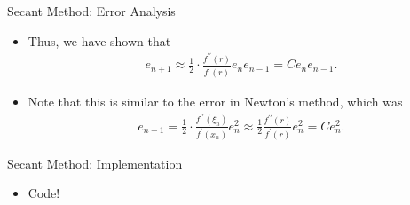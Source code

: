 \documentclass[9pt, serif]{beamer}
\newcommand{\bi}{\begin{itemize}}
\newcommand{\ei}{\end{itemize}}
\begin{document}
\begin{frame}{\hspace{50mm}Secant Method: Error Analysis}
	\bi 
		\item Thus, we have shown that %
			\begin{align*}
				e_{n+1}\approx\frac{1}{2}\cdot\frac{f^{\prime\prime}(r)}{f^\prime(r)}e_ne_{n-1}=Ce_ne_{n-1}.
			\end{align*}
		\pause
		\item Note that this is similar to the error in Newton's method, which was
			\begin{align*}
				e_{n+1}=\frac{1}{2}\cdot\frac{f^{\prime\prime}(\xi_n)}{f^\prime(x_n)}e^2_n\approx\frac{1}{2}\frac{f^{\prime\prime}(r)}{f^\prime(r)}e^2_n=Ce^2_n.
			\end{align*}
	\ei
\end{frame}

\begin{frame}{\hspace{50mm}Secant Method: Implementation}
	\bi
		\item Code!
	\ei
\end{frame}
\end{document}
